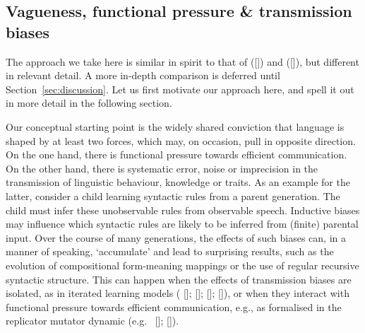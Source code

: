 \documentclass[12pt,english]{article}
\numberwithin{equation}{section}
\newcommand{\citetbjps}[1]{\citeauthor{#1} ([\citeyear{#1}])}
\newcommand{\citealtbjps}[1]{\citeauthor{#1} [\citeyear{#1}]}
\begin{document}
\subsection{Vagueness, functional pressure \& transmission biases}
\label{sec:vagu-funct-press}

The approach we take here is similar in spirit to that of
\citetbjps{FrankeJager2010:Vagueness-Signa} and \citetbjps{OConnor2013:The-Evolution-o}, but different
in relevant detail. A more in-depth comparison is deferred until
Section~\ref{sec:discussion}. Let us first motivate our approach here, and spell it out in more
detail in the following section.

Our conceptual starting point is the widely shared conviction that language is shaped by at
least two forces, which may, on occasion, pull in opposite direction. On the one hand, there is
functional pressure towards efficient communication. On the other hand, there is systematic
error, noise or imprecision in the transmission of linguistic behaviour, knowledge or traits. As
an example for the latter, consider a child learning syntactic rules from a parent
generation. The child must infer these unobservable rules from observable speech. Inductive
biases may influence which syntactic rules are likely to be inferred from (finite) parental
input. Over the course of many generations, the effects of such biases can, in a manner of
speaking, `accumulate' and lead to surprising results, such as the evolution of compositional
form-meaning mappings or the use of regular recursive syntactic structure. This can happen when
the effects of transmission biases are isolated, as in iterated learning models
(\citealtbjps{KirbyHurford2002:The-Emergence-o}; \citealtbjps{SmithKirby2003:Iterated-Learni}; \citealtbjps{GriffithsKalish2007:Language-Evolut}; \citealtbjps{KirbyGriffith2014:Iterated-Learni}),
or when they interact with functional pressure towards efficient communication, e.g., as
formalised in the replicator mutator dynamic
(e.g.~\citealtbjps{NowakPlotkin2000:The-Evolution-o}; \citealtbjps{NowakKomarova2001:Evolution-of-Un}).
\end{document}
